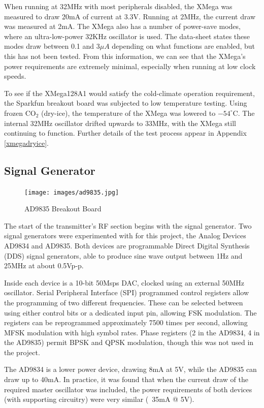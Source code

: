 \documentclass[a4paper,12pt]{article}
\begin{document}
When running at 32MHz with most peripherals disabled, the XMega was measured to draw 20mA of current at 3.3V. Running at 2MHz, the current draw was measured at 2mA. The XMega also has a number of power-save modes, where an ultra-low-power 32KHz oscillator is used. The data-sheet states these modes draw between 0.1 and $3\mu A$ depending on what functions are enabled, but this has not been tested. From this information, we can see that the XMega's power requirements are extremely minimal, especially when running at low clock speeds.

To see if the XMega128A1 would satisfy the cold-climate operation requirement, the Sparkfun breakout board was subjected to low temperature testing. Using frozen CO$_2$ (dry-ice), the temperature of the XMega was lowered to $-54^\circ$C. The internal 32MHz oscillator drifted upwards to 33MHz, with the XMega still continuing to function. Further details of the test process appear in  Appendix \ref{xmegadryice}.


\subsection{Signal Generator}
\begin{figure}
  \begin{center}
    \texttt{[image: images/ad9835.jpg]}
  \end{center}
  \caption{AD9835 Breakout Board}
  \label{fig:ad9835}
\end{figure}
The start of the transmitter's RF section begins with the signal generator. Two signal generators were experimented with for this project, the Analog Devices AD9834 and AD9835. Both devices are programmable Direct Digital Synthesis (DDS) signal generators, able to produce sine wave output between 1Hz and 25MHz at about 0.5Vp-p.

Inside each device is a 10-bit 50Msps DAC, clocked using an external 50MHz oscillator. Serial Peripheral Interface (SPI) programmed control registers allow the programming of two different frequencies. These can be selected between using either control bits or a dedicated input pin, allowing FSK modulation. The registers can be reprogrammed approximately 7500 times per second, allowing MFSK modulation with high symbol rates. Phase registers (2 in the AD9834, 4 in the AD9835) permit BPSK and QPSK modulation, though this was not used in the project.

The AD9834 is a lower power device, drawing 8mA at 5V, while the AD9835 can draw up to 40mA. In practice, it was found that when the current draw of the required master oscillator was included, the power requirements of both devices (with supporting circuitry) were very similar (~35mA @ 5V).
\end{document}
